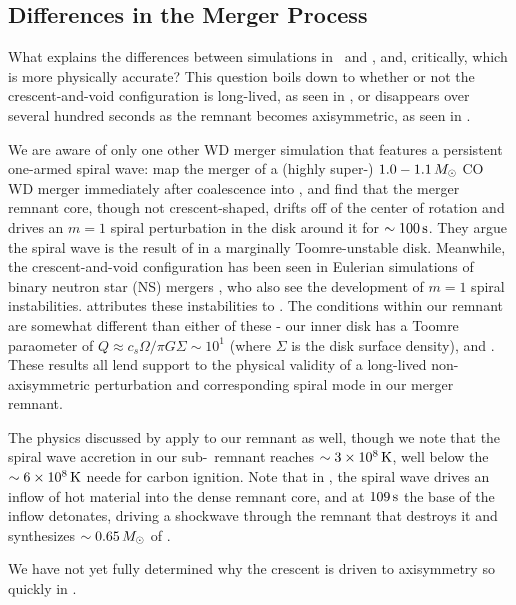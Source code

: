 
\subsection{Differences in the Merger Process}
\label{ssec:c3_differences_merger_process}

What explains the differences between simulations in \gasoline\ and \arepo, and, critically, which is more physically accurate?  This question boils down to whether or not the crescent-and-void configuration is long-lived, as seen in \arepo, or disappears over several hundred seconds as the remnant becomes axisymmetric, as seen in \gasoline.

We are aware of only one other WD merger simulation that features a persistent one-armed spiral wave: \citep{kash+15} map the merger of a (highly super-\Mch) $1.0-1.1\,\Msun$ CO WD merger immediately after coalescence into \flash, and find that the merger remnant core, though not crescent-shaped, drifts off of the center of rotation and drives an $m = 1$ spiral perturbation in the disk around it for $\sim100\,\mathrm{s}$.  They argue the spiral wave is the result of in a marginally Toomre-unstable disk.  Meanwhile, the crescent-and-void configuration has been seen in Eulerian simulations of binary neutron star (NS) mergers \citep{pasc15, radibo16}, who also see the development of $m = 1$ spiral instabilities.  \citep{pasc15} attributes these instabilities to .  The conditions within our remnant are somewhat different than either of these - our inner disk has a Toomre paraometer of $Q \approx c_s\Omega/\pi G \Sigma \sim 10^1$ (where $\Sigma$ is the disk surface density), and .  These results all lend support to the physical validity of a long-lived non-axisymmetric perturbation and corresponding spiral mode in our merger remnant.

The physics discussed by \citep{kash+15} apply to our remnant as well, though we note that the spiral wave accretion in our sub-\Mch\ remnant reaches $\sim3\times10^8\,\mathrm{K}$, well below the $\sim6\times10^8\,\mathrm{K}$ neede for carbon ignition.  Note that in \citep{kash+15}, the spiral wave drives an inflow of hot material into the dense remnant core, and at $109\,\mathrm{s}$ the base of the inflow detonates, driving a shockwave through the remnant that destroys it and synthesizes $\sim0.65\,\Msun$ of \Ni.

We have not yet fully determined why the crescent is driven to axisymmetry so quickly in \gasoline.  

